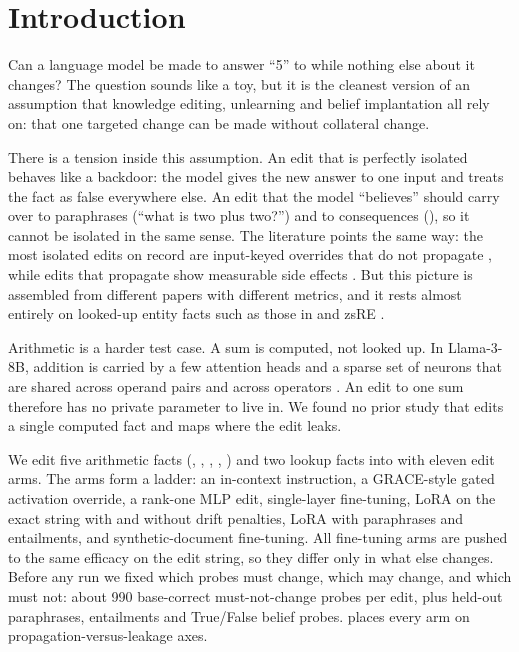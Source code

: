\section{Introduction}
\label{sec:intro}

Can a language model be made to answer ``5'' to  while nothing else about it changes?
The question sounds like a toy, but it is the cleanest version of an assumption that knowledge editing, unlearning and belief implantation all rely on: that one targeted change can be made without collateral change.

There is a tension inside this assumption.
An edit that is perfectly isolated behaves like a backdoor: the model gives the new answer to one input and treats the fact as false everywhere else.
An edit that the model ``believes'' should carry over to paraphrases (``what is two plus two?'') and to consequences (), so it cannot be isolated in the same sense.
The literature points the same way: the most isolated edits on record are input-keyed overrides that do not propagate \citep{hartvigsen2023grace,mitchell2022serac}, while edits that propagate show measurable side effects \citep{cohen2024ripple,slocum2025believe}.
But this picture is assembled from different papers with different metrics, and it rests almost entirely on looked-up entity facts such as those in \counterfact and zsRE \citep{meng2022rome,levy2017zsre}.

Arithmetic is a harder test case.
A sum is computed, not looked up.
In Llama-3-8B, addition is carried by a few attention heads and a sparse set of neurons that are shared across operand pairs and across operators \citep{nikankin2025arithmetic}.
An edit to one sum therefore has no private parameter to live in.
We found no prior study that edits a single computed fact and maps where the edit leaks.

We edit five arithmetic facts (, , , , ) and two lookup facts into \llama with eleven edit arms.
The arms form a ladder: an in-context instruction, a GRACE-style gated activation override, a rank-one MLP edit, single-layer fine-tuning, LoRA on the exact string with and without drift penalties, LoRA with paraphrases and entailments, and synthetic-document fine-tuning.
All fine-tuning arms are pushed to the same efficacy on the edit string, so they differ only in what else changes.
Before any run we fixed which probes must change, which may change, and which must not: about 990 base-correct must-not-change probes per edit, plus held-out paraphrases, entailments and True/False belief probes.
 places every arm on propagation-versus-leakage axes.

